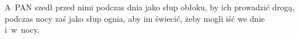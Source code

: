 A~PAN szedł przed nimi podczas dnia jako słup obłoku, by ich prowadzić drogą,
podczas nocy zaś jako słup ognia, aby im świecić, żeby mogli iść we dnie
i~w~nocy.\endinput
